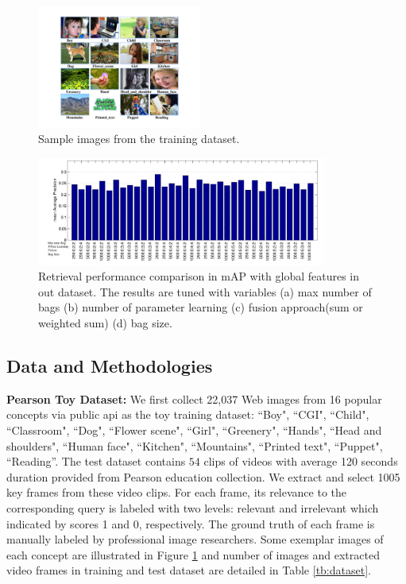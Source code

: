 \documentclass[11pt,twocolumn,twoside]{IEEEtran}
\begin{document}
\begin{figure}
\includegraphics[width=0.48\textwidth]{fig4.pdf}
\centering
\caption{Sample images from the training dataset.} \label{fig:fig4}
\end{figure}


\begin{figure}[t]
\includegraphics[width=0.85\textwidth]{fig3.pdf}
\centering
\caption{Retrieval performance comparison in mAP with global features in out dataset. The results are tuned with variables (a) max number of bags (b) number of parameter learning (c) fusion approach(sum or weighted sum) (d) bag size.} \label{fig:retrieval}
\end{figure}

\subsection{Data and Methodologies}
\textbf{Pearson Toy Dataset:} We first collect 22,037 Web images from 16 popular concepts via public api as the toy training dataset:
``Boy", ``CGI", ``Child", ``Classroom", ``Dog",  ``Flower scene",  ``Girl", ``Greenery", ``Hands", ``Head and shoulders", ``Human face", ``Kitchen", ``Mountains", ``Printed text", ``Puppet", ``Reading''.
The test dataset contains $54$ clips of videos with average 120 seconds duration provided from Pearson education collection. We extract and select 1005 key frames from these video clips. For each frame, its relevance to the corresponding query is labeled with two levels: relevant and irrelevant which indicated by scores 1 and 0, respectively. The ground truth of each frame is manually labeled by professional image researchers. Some exemplar images of each concept are illustrated in Figure \ref{fig:fig4} and number of images and extracted video frames in training and test dataset are detailed in Table \ref{tb:dataset}.
\end{document}
